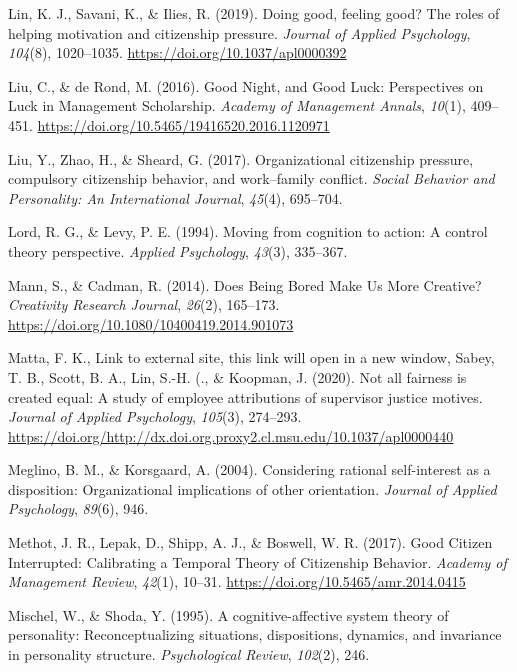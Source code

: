 \documentclass[english,,man]{apa6}
\begin{document}
\leavevmode\hypertarget{ref-lin_doing_2019}{}%
Lin, K. J., Savani, K., \& Ilies, R. (2019). Doing good, feeling good? The roles of helping motivation and citizenship pressure. \emph{Journal of Applied Psychology}, \emph{104}(8), 1020--1035. \url{https://doi.org/10.1037/apl0000392}

\leavevmode\hypertarget{ref-liu_good_2016}{}%
Liu, C., \& de Rond, M. (2016). Good Night, and Good Luck: Perspectives on Luck in Management Scholarship. \emph{Academy of Management Annals}, \emph{10}(1), 409--451. \url{https://doi.org/10.5465/19416520.2016.1120971}

\leavevmode\hypertarget{ref-liu_organizational_2017}{}%
Liu, Y., Zhao, H., \& Sheard, G. (2017). Organizational citizenship pressure, compulsory citizenship behavior, and work--family conflict. \emph{Social Behavior and Personality: An International Journal}, \emph{45}(4), 695--704.

\leavevmode\hypertarget{ref-lord_moving_1994}{}%
Lord, R. G., \& Levy, P. E. (1994). Moving from cognition to action: A control theory perspective. \emph{Applied Psychology}, \emph{43}(3), 335--367.

\leavevmode\hypertarget{ref-mann_does_2014}{}%
Mann, S., \& Cadman, R. (2014). Does Being Bored Make Us More Creative? \emph{Creativity Research Journal}, \emph{26}(2), 165--173. \url{https://doi.org/10.1080/10400419.2014.901073}

\leavevmode\hypertarget{ref-matta_not_2020}{}%
Matta, F. K., Link to external site, this link will open in a new window, Sabey, T. B., Scott, B. A., Lin, S.-H. (., \& Koopman, J. (2020). Not all fairness is created equal: A study of employee attributions of supervisor justice motives. \emph{Journal of Applied Psychology}, \emph{105}(3), 274--293. \url{https://doi.org/http://dx.doi.org.proxy2.cl.msu.edu/10.1037/apl0000440}

\leavevmode\hypertarget{ref-meglino_considering_2004}{}%
Meglino, B. M., \& Korsgaard, A. (2004). Considering rational self-interest as a disposition: Organizational implications of other orientation. \emph{Journal of Applied Psychology}, \emph{89}(6), 946.

\leavevmode\hypertarget{ref-methot_good_2017}{}%
Methot, J. R., Lepak, D., Shipp, A. J., \& Boswell, W. R. (2017). Good Citizen Interrupted: Calibrating a Temporal Theory of Citizenship Behavior. \emph{Academy of Management Review}, \emph{42}(1), 10--31. \url{https://doi.org/10.5465/amr.2014.0415}

\leavevmode\hypertarget{ref-mischel_cognitive-affective_1995}{}%
Mischel, W., \& Shoda, Y. (1995). A cognitive-affective system theory of personality: Reconceptualizing situations, dispositions, dynamics, and invariance in personality structure. \emph{Psychological Review}, \emph{102}(2), 246.
\end{document}
